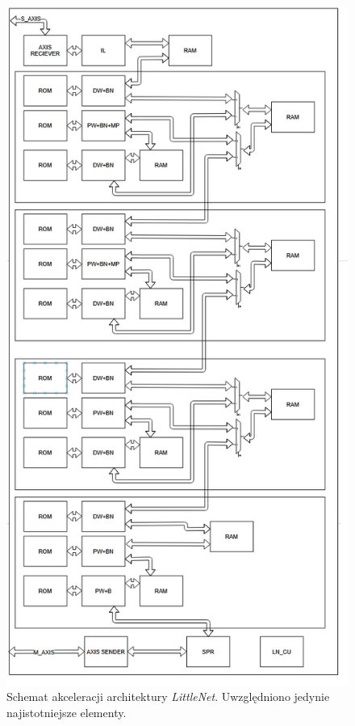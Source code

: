 \begin{figure}
    \centering
    \includegraphics[height=0.9\textheight]{images/LNACC.png}
    \caption{Schemat akceleracji architektury \emph{LittleNet}. Uwzględniono jedynie najistotniejsze elementy.}
    \label{fig:LNACC}
\end{figure}
